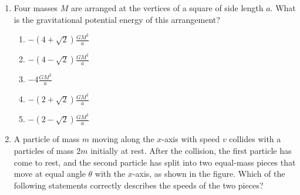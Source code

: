 \documentclass[12pt,letterpaper]{article}
\begin{document}
\begin{enumerate}[resume]

\vfill
\newpage

\item
Four masses $M$ are arranged at the vertices of a square of side length $a$. What is the gravitational potential energy of this arrangement?
\begin{enumerate}
\item $\displaystyle -\left(4+\sqrt{2}\right)\frac{GM^2}{a}$
\item $\displaystyle -\left(4-\sqrt{2}\right)\frac{GM^2}{a}$
\item $\displaystyle -4\frac{GM^2}{a}$
\item $\displaystyle -\left(2+\sqrt{2}\right)\frac{GM^2}{a}$
\item $\displaystyle -\left(2-\sqrt{2}\right)\frac{GM^2}{a}$
\end{enumerate}

\item
A particle of mass $m$ moving along the $x$-axis with speed $v$ collides with a particles of mass $2m$ initially at rest. After the collision, the first particle has come to rest, and the second particle has split into two equal-mass pieces that move at equal angle $\theta$ with the $x$-axis, as shown in the figure. Which of the following statements correctly describes the speeds of the two pieces?

\begin{tabular}{l r}


\end{tabular}
\end{enumerate}
\end{document}
